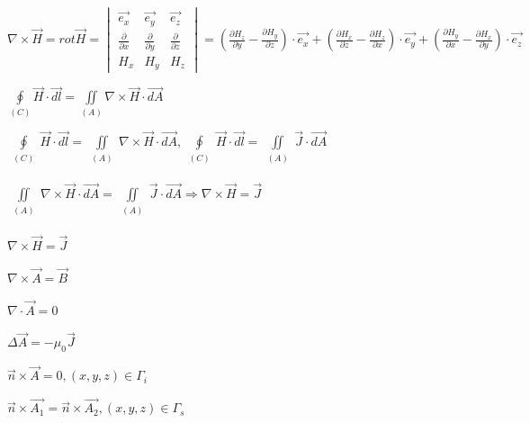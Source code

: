 $\nabla\times\vec{H}=rot \vec{H}=\begin{vmatrix}\overrightarrow{e_x}&\overrightarrow{e_y}&\overrightarrow{e_z}\\\frac{\partial}{\partial x}&\frac{\partial}{\partial y}&\frac{\partial}{\partial z}\\H_x&H_y&H_z\end{vmatrix}=\left(\frac{\partial H_z}{\partial y}-\frac{\partial H_y}{\partial z}\right)\cdot\overrightarrow{e_x}+\left(\frac{\partial H_x}{\partial z}-\frac{\partial H_z}{\partial x}\right)\cdot\overrightarrow{e_y}+\left(\frac{\partial H_y}{\partial x}-\frac{\partial H_x}{\partial y}\right)\cdot\overrightarrow{e_z}$

$\oint\limits_{(C)}\overrightarrow{H}\cdot\overrightarrow{dl}=\iint\limits_{(A)}\nabla\times\overrightarrow{H}\cdot\overrightarrow{dA}$

$\oint\limits_{\begin{array}{c}(C)\\\end{array}}\vec{H}\cdot\overrightarrow{dl}=\iint\limits_{\begin{array}{c}(A)\\\end{array}}\nabla\times\vec{H}\cdot\overrightarrow{dA},\oint\limits_{\begin{array}{c}(C)\\\end{array}}\vec{H}\cdot\overrightarrow{dl}=\iint\limits_{\begin{array}{c}(A)\\\end{array}}\vec{J}\cdot\overrightarrow{dA}$

$\iint\limits_{\begin{array}{c}(A)\\\end{array}}\nabla\times\vec{H}\cdot\overrightarrow{dA}=\iint\limits_{\begin{array}{c}(A)\\\end{array}}\vec{J}\cdot\overrightarrow{dA}\Rightarrow\boxed{\nabla\times\vec{H}=\vec{J}}$

$\nabla\times\vec{H}=\vec{J}$

$\nabla\times\vec{A}=\vec{B}$

$\nabla\cdot\vec{A}=0$

$\Delta\vec{A}=-\mu_0\vec{J}$

$\vec{n}\times\vec{A}=0,(x,y,z)\in\Gamma_i$

$\vec{n}\times\overrightarrow{A_1}=\vec{n}\times\overrightarrow{A_2},(x,y,z)\in\Gamma_s$

